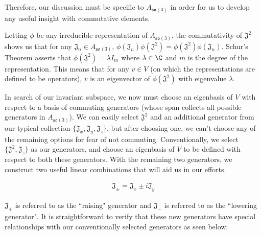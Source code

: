 Therefore, our discussion must be specific to $A_{\mathfrak{so}(3)}$ in order for us to develop any useful insight with commutative elements.

Letting $\phi$ be any irreducible representation of $A_{\mathfrak{so}(3)}$, the commutativity of $\mathfrak{J^2}$ shows us that for any $\mathfrak{J}_n \in A_{\mathfrak{so}(3)}$, $\phi(\mathfrak{J}_n)\phi(\mathfrak{J^2}) = \phi(\mathfrak{J^2})\phi(\mathfrak{J}_n)$. Schur's Theorem asserts that $\phi(\mathfrak{J^2}) = \lambda I_m$ where $\lambda\in\C$ and $m$ is the degree of the representation. This means that for any $v\in V$ (on which the representations are defined to be operators), $v$ is an eigenvector of $\phi(\mathfrak{J^2})$ with eigenvalue $\lambda$.

In search of our invariant subspace, we now must choose an eigenbasis of $V$ with respect to a basis of commuting generators (whose span collects all possible generators in $A_{\mathfrak{so}(3)}$). We can easily select $\mathfrak{J^2}$ and an additional generator from our typical collection $\{\mathfrak{J}_x,\mathfrak{J}_y,\mathfrak{J}_z\}$, but after choosing one, we can't choose any of the remaining options for fear of not commuting. Conventionally, we select $\{\mathfrak{J^2},\mathfrak{J}_z\}$ as our generators, and choose an eigenbasis of $V$ to be defined with respect to both these generators. With the remaining two generators, we construct two useful linear combinations that will aid us in our efforts.

\begin{equation}
	\begin{aligned}
		\mathfrak{J}_\pm = \mathfrak{J}_x \pm i\mathfrak{J}_y
	\end{aligned}
\end{equation} 

$\mathfrak{J}_+$ is referred to as the ``raising" generator and $\mathfrak{J}_-$ is referred to as the ``lowering generator". It is straightforward to verify that these new generators have special relationships with our conventionally selected generators as seen below:

